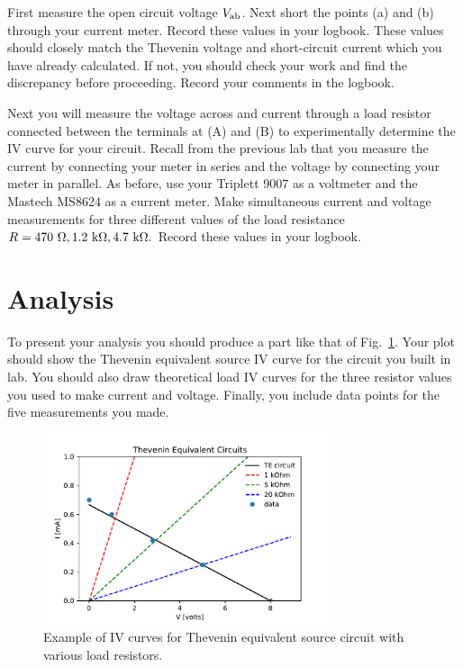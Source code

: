 \begin{measurement} First measure the open circuit voltage $V_{\rm ab}$.
Next short the points (a) and (b) through your current meter. Record these values in your logbook. 
 These
values should closely match the Thevenin voltage and short-circuit
current which you have already calculated.  If not, you should check
your work and find the discrepancy before proceeding. Record your comments in the logbook. \end{measurement}

\begin{measurement}  Next you will measure the voltage across and current through a load
resistor connected between the terminals at (A) and (B) to
experimentally determine the IV curve for your circuit.  Recall from
the previous lab that you measure the current by connecting your meter
in series and the voltage by connecting your meter in parallel.  As
before, use your Triplett 9007 as a voltmeter and the Mastech MS8624
as a current meter. Make simultaneous current and voltage measurements for three different
values of the load resistance $R = 470~{\rm \Omega}, 1.2~\rm k\Omega,
4.7~\rm k\Omega.$ Record these values in your logbook. \end{measurement}




\section{Analysis}

\begin{plot}To present your analysis you should produce a part like
that of Fig.~\ref{fig:egthev}.  Your plot should show the Thevenin
equivalent source IV curve for the circuit you built in lab.  You
should also draw theoretical load IV curves for the three resistor
values you used to make current and voltage.  Finally, you include
data points for the five measurements you made. \end{plot}


\begin{figure}[htbp]
\begin{center}
\includegraphics[width=0.75\textwidth]{figs/labs/thevenin/final.pdf} 
\caption{Example of IV curves for Thevenin equivalent source circuit with various load resistors. }
\label{fig:egthev}
\end{center}
\end{figure}

